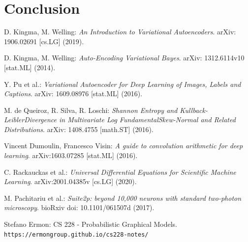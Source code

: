 \documentclass[12pt]{report}
\theoremstyle{definition}
\begin{document}
\chapter{Conclusion}


\medskip

\begin{thebibliography}{9}

D. Kingma, M. Welling:
\textit{An Introduction to Variational Autoencoders}.
arXiv: 1906.02691 [cs.LG] (2019).

D. Kingma, M. Welling:
\textit{Auto-Encoding Variational Bayes}.
arXiv: 1312.6114v10 [stat.ML] (2014).

Y. Pu et al.:
\textit{Variational Autoencoder for Deep Learning of Images, Labels and Captions}.
arXiv: 1609.08976 [stat.ML] (2016).

M. de Queiroz, R. Silva, R. Loschi:
\textit{Shannon Entropy and Kullback-LeiblerDivergence in Multivariate Log FundamentalSkew-Normal and Related Distributions}.
arXiv: 1408.4755 [math.ST] (2016).

Vincent Dumoulin, Francesco Visin:
\textit{A guide to convolution arithmetic for deep learning}.
arXiv:1603.07285 [stat.ML] (2016).

C. Rackauckas et al.:
\textit{Universal Differential Equations for Scientific Machine Learning}.
arXiv:2001.04385v [cs.LG] (2020).

M. Pachitariu et al.:
\textit{Suite2p: beyond 10,000 neurons with standard two-photon microscopy}.
bioRxiv doi: 10.1101/061507d (2017).

Stefano Ermon: CS 228 - Probabilistic Graphical Models.
\\\texttt{https://ermongroup.github.io/cs228-notes/}
\end{thebibliography}
\end{document}

